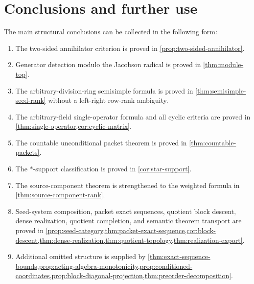 \documentclass[11pt]{article}
\theoremstyle{definition}
\theoremstyle{remark}
\theoremstyle{definition}\newtheorem{example}[theorem]{Example}
\begin{document}
\clearpage\section{Conclusions and further use}

The main structural conclusions can be collected in the following form:
\begin{enumerate}[label=\textbf{I.\arabic*.},leftmargin=*,itemsep=0.3em,topsep=0.4em]
\item The two-sided annihilator criterion is proved in \cref{prop:two-sided-annihilator}.
\item Generator detection modulo the Jacobson radical is proved in \cref{thm:module-top}.
\item The arbitrary-division-ring semisimple formula is proved in \cref{thm:semisimple-seed-rank} without a left-right row-rank ambiguity.
\item The arbitrary-field single-operator formula and all cyclic criteria are proved in \cref{thm:single-operator,cor:cyclic-matrix}.
\item The countable unconditional packet theorem is proved in \cref{thm:countable-packets}.
\item The $*$-support classification is proved in \cref{cor:star-support}.
\item The source-component theorem is strengthened to the weighted formula in \cref{thm:source-component-rank}.
\item Seed-system composition, packet exact sequences, quotient block descent, dense realization, quotient completion, and semantic theorem transport are proved in \cref{prop:seed-category,thm:packet-exact-sequence,cor:block-descent,thm:dense-realization,thm:quotient-topology,thm:realization-export}.
\item Additional omitted structure is supplied by \cref{thm:exact-sequence-bounds,prop:acting-algebra-monotonicity,prop:conditioned-coordinates,prop:block-diagonal-projection,thm:preorder-decomposition}.
\end{enumerate}

\clearpage\appendix
\end{document}
